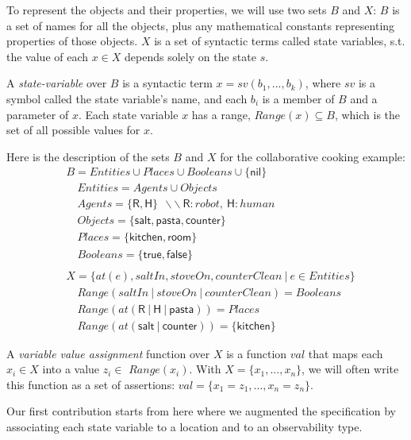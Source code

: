 To represent the objects and their properties, we will use two sets $B$ and $X$: $B$ is a set of names for all the objects, plus any mathematical constants representing properties of those objects. $X$ is a set of syntactic terms called state variables, s.t. the value of each $x \in X$ depends solely on the state $s$.

A \textit{state-variable} over $B$ is a syntactic term $x = sv(b_1, ..., b_k)$, where $sv$ is a symbol called the state variable's name, and each $b_i$ is a member of $B$ and a parameter of $x$. Each state variable $x$ has a range, $\textit{Range}(x) \subseteq B$, which is the set of all possible values for $x$.

Here is the description of the sets $B$ and $X$ for the collaborative cooking example:
{\small
\begin{align*}
&B           = Entities \cup Places \cup Booleans \cup \{\textsf{nil}\} \\
&\quad Entities    = Agents \cup Objects\\
&\quad Agents      = \{ \textsf{R}, \textsf{H} \} ~~ \backslash\backslash~\textsf{R}:robot,~\textsf{H}:human\\
&\quad Objects     = \{ \textsf{salt}, \textsf{pasta}, \textsf{counter} \}\\
&\quad Places      = \{ \textsf{kitchen}, \textsf{room} \}\\
&\quad Booleans    = \{ \textsf{true},\textsf{false} \}\\
&\\
&X = \{ at(e), saltIn, stoveOn, counterClean ~ | ~ e \in Entities \}\\
&\quad \textit{Range}(saltIn ~|~ stoveOn ~|~ counterClean)=Booleans\\
&\quad \textit{Range}(at(\textsf{R} ~|~ \textsf{H} ~|~ \textsf{pasta})) = Places\\
&\quad \textit{Range}(at(\textsf{salt} ~|~ \textsf{counter})) = \{ \textsf{kitchen} \}
\end{align*}
}

A \textit{variable value assignment} function over $X$ is a function $val$ that maps each $x_i \in X$ into a value $z_i \in$ $\textit{Range}(x_i)$. With $X = \{ x_1, ..., x_n \}$, we will often write this function as a set of assertions: $val = \{ x_1=z_1, \ldots, x_n=z_n \}$. 

Our first contribution starts from here where we augmented the specification by associating each state variable to a location and to an observability type.

